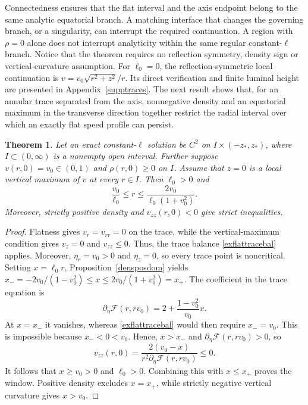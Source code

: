 \documentclass[amsmath,amsfonts,amssymb,aps,pra,superscriptaddress,10pt]{revtex4-2}
\numberwithin{equation}{section}
\theoremstyle{plain}
\newtheorem{theorem}{Theorem}
\theoremstyle{definition}
\theoremstyle{remark}
\theoremstyle{definition}
\newcommand{\ellzero}{\ell_0}
\begin{document}
Connectedness ensures that the flat interval and the axis endpoint belong to the same analytic equatorial branch. A matching interface that changes the governing branch, or a singularity, can interrupt the required continuation. A region with $\rho=0$ alone does not interrupt analyticity within the same regular constant-$\ell$ branch. Notice that the theorem requires no reflection symmetry, density sign or vertical-curvature assumption. For $\ellzero=0$, the reflection-symmetric local continuation is
$v=v_0\sqrt{r^2+z^2}/r$. Its direct verification and finite luminal
height are presented in Appendix~\ref{supptraces}. The next result shows that, for an annular trace separated from the axis, nonnegative density and an equatorial maximum in the transverse direction together restrict the radial interval over which an exactly flat speed profile can persist.

\begin{theorem}\label{anulflattracebound}
Let an exact constant-$\ell$ solution be $C^2$ on $I\times(-z_*,z_*)$, where $I\subset(0,\infty)$ is a nonempty open interval. Further suppose $v(r,0)=v_0\in(0,1)$ and $\rho(r,0)\geq 0$ on $I$. Assume that $z=0$ is a local vertical maximum of $v$ at every $r\in I$. Then $\ellzero>0$ and
\begin{equation}
\frac{v_0}{\ellzero}\leq r\leq\frac{2v_0}{\ellzero(1+v_0^2)}.
\end{equation}
Moreover, strictly positive density and $v_{zz}(r,0)<0$ give strict inequalities.
\end{theorem}

\begin{proof}
Flatness gives $v_r=v_{rr}=0$ on the trace, while the vertical-maximum condition gives $v_z=0$ and $v_{zz}\leq 0$. Thus, the trace balance \eqref{exflattracebal} applies. Moreover, $\eta_r=v_0>0$ and $\eta_z=0$, so every trace point is noncritical. Setting $x=\ellzero r$, Proposition~\ref{densposdom} yields $x_-=-2v_0/(1-v_0^2)\leq x\leq
2v_0/(1+v_0^2)=x_+$. The coefficient in the trace equation is
\begin{equation}
\partial_\eta\mathcal{F}(r,rv_0)=2+\frac{1-v_0^2}{v_0}x.
\end{equation}
At $x=x_-$ it vanishes, whereas \eqref{exflattracebal} would then require $x_-=v_0$. This is impossible because $x_-<0<v_0$. Hence, $x>x_-$ and $\partial_\eta\mathcal{F}(r,rv_0)>0$, so
\begin{equation}
v_{zz}(r,0)=\frac{2(v_0-x)}{r^2\partial_\eta\mathcal{F}(r,rv_0)}\leq 0.
\end{equation}
It follows that $x\geq v_0>0$ and $\ellzero>0$. Combining this with $x\leq x_+$ proves the window. Positive density excludes $x=x_+$, while strictly negative vertical curvature gives $x>v_0$.
\end{proof}
\end{document}
